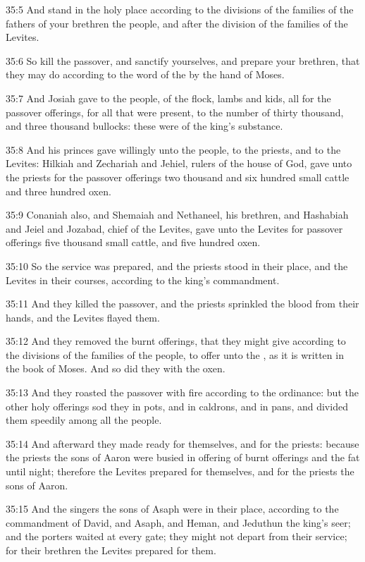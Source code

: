 35:5 And stand in the holy place according to the divisions of the
families of the fathers of your brethren the people, and after the
division of the families of the Levites.

35:6 So kill the passover, and sanctify yourselves, and prepare your
brethren, that they may do according to the word of the \LORD by the
hand of Moses.

35:7 And Josiah gave to the people, of the flock, lambs and kids, all
for the passover offerings, for all that were present, to the number
of thirty thousand, and three thousand bullocks: these were of the
king's substance.

35:8 And his princes gave willingly unto the people, to the priests,
and to the Levites: Hilkiah and Zechariah and Jehiel, rulers of the
house of God, gave unto the priests for the passover offerings two
thousand and six hundred small cattle and three hundred oxen.

35:9 Conaniah also, and Shemaiah and Nethaneel, his brethren, and
Hashabiah and Jeiel and Jozabad, chief of the Levites, gave unto the
Levites for passover offerings five thousand small cattle, and five
hundred oxen.

35:10 So the service was prepared, and the priests stood in their
place, and the Levites in their courses, according to the king's
commandment.

35:11 And they killed the passover, and the priests sprinkled the
blood from their hands, and the Levites flayed them.

35:12 And they removed the burnt offerings, that they might give
according to the divisions of the families of the people, to offer
unto the \LORD, as it is written in the book of Moses. And so did they
with the oxen.

35:13 And they roasted the passover with fire according to the
ordinance: but the other holy offerings sod they in pots, and in
caldrons, and in pans, and divided them speedily among all the people.

35:14 And afterward they made ready for themselves, and for the
priests: because the priests the sons of Aaron were busied in offering
of burnt offerings and the fat until night; therefore the Levites
prepared for themselves, and for the priests the sons of Aaron.

35:15 And the singers the sons of Asaph were in their place, according
to the commandment of David, and Asaph, and Heman, and Jeduthun the
king's seer; and the porters waited at every gate; they might not
depart from their service; for their brethren the Levites prepared for
them.

